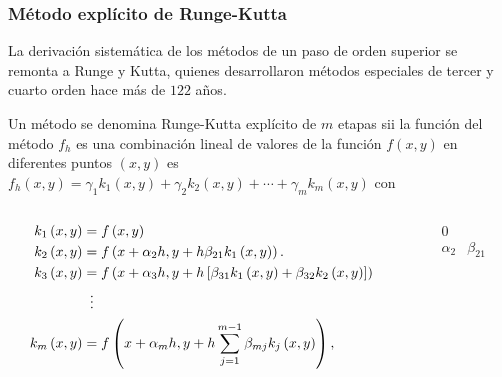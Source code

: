 
\begin{frame}
	\frametitle{Método explícito de Runge-Kutta}
	La derivación sistemática de los métodos de un paso de orden
	superior se remonta a Runge y Kutta, quienes desarrollaron métodos
	especiales de tercer y cuarto orden hace más de $122$ años.

	\begin{definition}
		Un método se denomina \alert{Runge-Kutta explícito de $m$ etapas}
		sii la función del método $f_{h}$ es una combinación lineal de
		valores de la función $f\left(x,y\right)$ en diferentes puntos
		$\left(x,y\right)$ es
		\begin{math}
			f_{h}\left(x,y\right)=
			\gamma_{1}k_{1}\left(x,y\right)+
			\gamma_{2}k_{2}\left(x,y\right)+
			\cdots+
			\gamma_{m}k_{m}\left(x,y\right)
		\end{math}
		con
		\begin{columns}
			\begin{column}{0.48\textwidth}
				\begin{align*}
					k_{1}\left(x,y\right) & =
					f\left(
					x,y
					\right)                                 \\
					k_{2}\left(x,y\right) & =
					f\left(
					x+\alpha_{2}h,
					y+h\beta_{21}k_{1}\left(x,y\right)
					\right).                                \\
					k_{3}\left(x,y\right) & =
					f\left(
					x+\alpha_{3}h,
					y+h\left[\beta_{31}k_{1}\left(x,y\right)+\beta_{32}k_{2}\left(x,y\right)\right]
					\right)                                 \\
					                      & \vdotswithin{=} \\
					k_{m}\left(x,y\right) & =
					f\left(x+\alpha_{m}h,y+h\sum\limits_{j=1}^{m-1}\beta_{mj}k_{j}\left(x,y\right)\right),
				\end{align*}
			\end{column}
			\begin{column}{0.48\textwidth}
				\begin{equation*}
					\begin{array}
						{c|ccccc}
						0                                                                    \\
						\alpha_{2} & \beta_{21}                                              \\

\end{array}
\end{equation*}
\end{column}
\end{columns}
\end{definition}
\end{frame}
